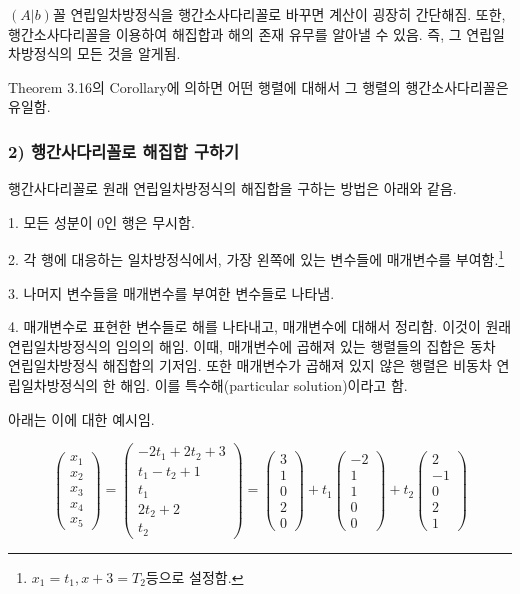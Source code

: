 $(A|b)$꼴 연립일차방정식을 행간소사다리꼴로 바꾸면 계산이 굉장히 간단해짐. 또한, 행간소사다리꼴을 이용하여 해집합과 해의 존재 유무를 알아낼 수 있음. 즉, 그 연립일차방정식의 모든 것을 알게됨.

Theorem 3.16의 Corollary에 의하면 어떤 행렬에 대해서 그 행렬의 행간소사다리꼴은 유일함.


\newpage


\subsubsection*{2) 행간사다리꼴로 해집합 구하기}
행간사다리꼴로 원래 연립일차방정식의 해집합을 구하는 방법은 아래와 같음.

1. 모든 성분이 0인 행은 무시함.

2. 각 행에 대응하는 일차방정식에서, 가장 왼쪽에 있는 변수들에 매개변수를 부여함.\footnote{$x_1=t_1, x+3=T_2$등으로 설정함.}

3. 나머지 변수들을 매개변수를 부여한 변수들로 나타냄.

4. 매개변수로 표현한 변수들로 해를 나타내고, 매개변수에 대해서 정리함. 이것이 원래 연립일차방정식의 임의의 해임. 이때, 매개변수에 곱해져 있는 행렬들의 집합은 동차 연립일차방정식 해집합의 기저임. 또한 매개변수가 곱해져 있지 않은 행렬은 비동차 연립일차방정식의 한 해임. 이를 특수해(particular solution)이라고 함.

아래는 이에 대한 예시임.

\[
\begin{pmatrix}
x_1\\
x_2\\
x_3\\
x_4\\
x_5
\end{pmatrix}
=
\begin{pmatrix}
-2t_1+2t_2+3\\
t_1-t_2+1\\
t_1\\
2t_2+2\\
t_2
\end{pmatrix}
=
\begin{pmatrix}
3\\
1\\
0\\
2\\
0
\end{pmatrix}
+t_1
\begin{pmatrix}
-2\\
1\\
1\\
0\\
0
\end{pmatrix}
+t_2
\begin{pmatrix}
2\\
-1\\
0\\
2\\
1
\end{pmatrix}
\]

